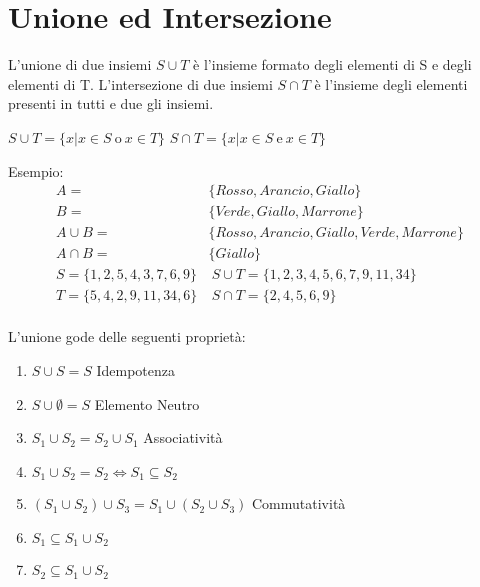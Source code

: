 \section{Unione ed Intersezione}
L'unione di due insiemi $S \cup T$ è l'insieme formato degli elementi di S e degli
elementi di T.\newline
L'intersezione di due insiemi $S \cap T$ è l'insieme degli elementi presenti in
tutti e due gli insiemi.

$S \cup T = \{x | x \in S \ \text{o} \ x \in T \} $ \newline
$S \cap T = \{x | x \in S \ \text{e} \ x \in T \} $

Esempio:
\begin{align*}
A = & \{Rosso,Arancio,Giallo \} \\
B = & \{Verde,Giallo,Marrone \} \\
A \cup B = & \{Rosso,Arancio,Giallo,Verde,Marrone \} \\
A \cap B = & \{Giallo \} \\
S = \{1,2,5,4,3,7,6,9\}  & \ S \cup T = \{1,2,3,4,5,6,7,9,11,34\} \\
T = \{5,4,2,9,11,34,6\}  & \ S \cap T = \{2,4,5,6,9\} \\
\end{align*}

\begin{prop}
    L'unione gode delle seguenti proprietà:
\end{prop}
\begin{enumerate}
\item $S \cup S = S$ \quad Idempotenza
\item $S \cup \emptyset = S$ \quad Elemento Neutro
\item $S_1 \cup S_2 = S_2 \cup S_1$ \quad Associatività
\item $S_1 \cup S_2 = S_2 \iff S_1 \subseteq S_2$
\item $(S_1 \cup S_2) \cup S_3 = S_1 \cup (S_2 \cup S_3)$ \quad Commutatività
\item $S_1 \subseteq S_1 \cup S_2$
\item $S_2 \subseteq S_1 \cup S_2$
\end{enumerate}

